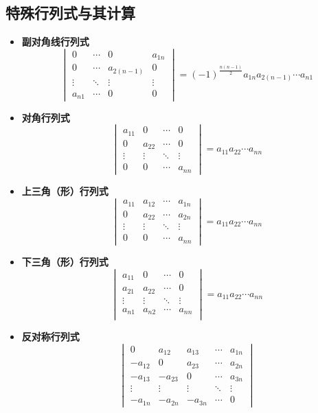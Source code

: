 \documentclass[UTF8]{ctexart}
\begin{document}
\subsection*{特殊行列式与其计算}
\begin{itemize}
  \item \textbf{副对角线行列式}
  \[\begin{vmatrix}
  0&\cdots&0&a_{1n}\\
  0&\cdots&a_{2(n-1)}&0\\
  \vdots&\ddots&\vdots&\vdots\\
  a_{n1}&\cdots&0&0
  \end{vmatrix}
  =(-1)^{\frac{n(n-1)}{2}}a_{1n}a_{2(n-1)}\cdots a_{n1}
  \]
  \item \textbf{对角行列式}
  \[\begin{vmatrix}
  a_{11}&0 & \cdots & 0\\
  0&a_{22} & \cdots & 0\\
  \vdots&\vdots&\ddots&\vdots\\
  0&0&\cdots&a_{nn}
  \end{vmatrix}
  =a_{11}a_{22}\cdots a_{nn}\]
  \item \textbf{上三角（形）行列式}
  \[\begin{vmatrix}
  a_{11}&a_{12}&\cdots&a_{1n}\\
  0&a_{22}&\cdots&a_{2n}\\
  \vdots&\vdots&\ddots&\vdots\\
  0&0&\cdots&a_{nn}
  \end{vmatrix}
  =a_{11}a_{22}\cdots a_{nn}\]
  \item \textbf{下三角（形）行列式}
  \[\begin{vmatrix}
  a_{11}&0&\cdots&0\\
  a_{21}&a_{22}&\cdots&0\\
  \vdots&\vdots&\ddots&\vdots\\
  a_{n1}&a_{n2}&\cdots&a_{nn}\\
  \end{vmatrix}
  =a_{11}a_{22}\cdots a_{nn}\]
  \item \textbf{反对称行列式}
  \[\begin{vmatrix}
  0&a_{12}&a_{13}&\cdots&a_{1n}\\
  -a_{12}&0&a_{23}&\cdots&a_{2n}\\
  -a_{13}&-a_{23}&0&\cdots&a_{3n}\\
  \vdots&\vdots&\vdots&\ddots&\vdots\\
  -a_{1n}&-a_{2n}&-a_{3n}&\cdots&0
\end{vmatrix}
\]
\end{itemize}
\end{document}
